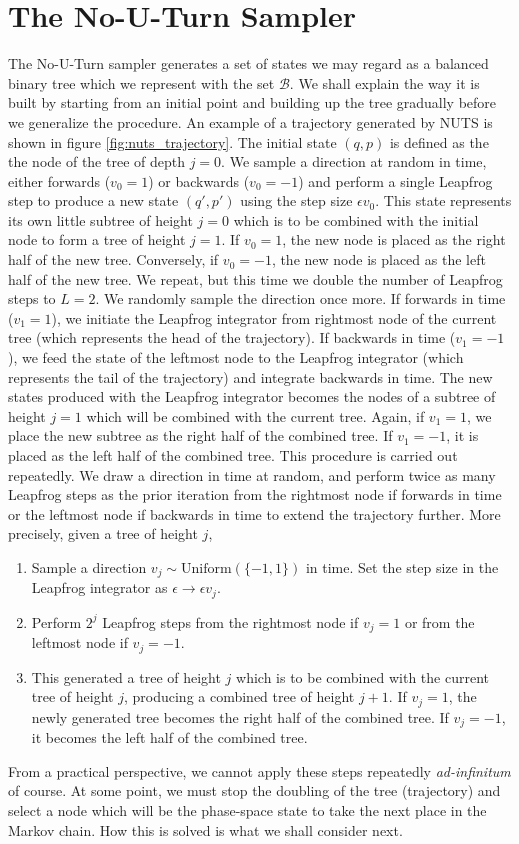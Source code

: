 \section{The No-U-Turn Sampler}
The No-U-Turn sampler generates a set of states we may regard as a balanced binary tree which we represent with the set $\mathcal{B}$. 
We shall explain the way it is built by starting from an initial point and building up the tree gradually before we generalize the procedure. An example of a trajectory generated by NUTS is shown in figure \ref{fig:nuts_trajectory}. 
The initial state $(q, p)$ is defined as the the node of the tree of depth $j = 0$. We sample a direction at random in time, either forwards ($v_0 = 1$) or backwards ($v_0 = -1$) and perform a single Leapfrog step to produce a new state $(q', p')$ using the step size $\epsilon v_0$. This state represents its own little subtree of height $j = 0$ which is to be combined with the initial node to form a tree of height $j = 1$. If $v_0 = 1$, the new node is placed as the right half of the new tree. Conversely, if $v_0 = -1$, the new node is placed as the left half of the new tree. We repeat, but this time we double the number of Leapfrog steps to $L = 2$. We randomly sample the direction once more. If forwards in time ($v_1 = 1$), we initiate the Leapfrog integrator from rightmost node of the current tree (which represents the head of the trajectory). If backwards in time ($v_1 = -1$), we feed the state of the leftmost node to the Leapfrog integrator (which represents the tail of the trajectory) and integrate backwards in time. The new states produced with the Leapfrog integrator becomes the nodes of a subtree of height $j = 1$ which will be combined with the current tree. Again, if $v_1 = 1$, we place the new subtree as the right half of the combined tree. If $v_1 = -1$, it is placed as the left half of the combined tree. 
This procedure is carried out repeatedly. We draw a direction in time at random, and perform twice as many Leapfrog steps as the prior iteration from the rightmost node if forwards in time or the leftmost node if backwards in time to extend the trajectory further. More precisely, given a tree of height $j$, 
\begin{enumerate}
    \item Sample a direction $v_j \sim \text{Uniform}(\{-1, 1\})$ in time. Set the step size in the Leapfrog integrator as $\epsilon \to \epsilon v_j$.
    \item Perform $2^j$ Leapfrog steps from the rightmost node if $v_j = 1$ or from the leftmost node if $v_j = -1$.  
    \item This generated a tree of height $j$ which is to be combined with the current tree of height $j$, producing a combined tree of height $j + 1$. If $v_j = 1$, the newly generated tree becomes the right half of the combined tree. If $v_j = -1$, it becomes the left half of the combined tree.
\end{enumerate}
From a practical perspective, we cannot apply these steps repeatedly \textit{ad-infinitum} of course. At some point, we must stop the doubling of the tree (trajectory) and select a node which will be the phase-space state to take the next place in the Markov chain. How this is solved is what we shall consider next.


